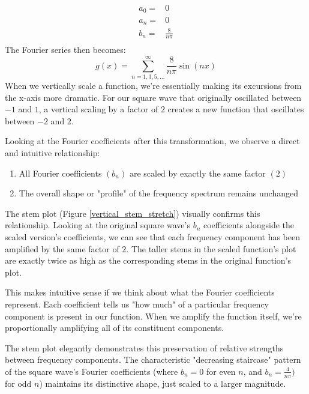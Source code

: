 \documentclass{article}
\begin{document}
    \begin{eqnarray}
    a_0 =& 0\nonumber\\
    a_n =& 0\\
    b_n =& \frac{8}{n\pi}\nonumber\\
    \end{eqnarray}
The Fourier series then becomes:
    \begin{equation}
g(x) = \sum_{n=1,3,5,...}^{\infty} \frac{8}{n\pi} \sin\left(nx\right)
    \end{equation}
When we vertically scale a function, we're essentially making its excursions from the x-axis more dramatic. For our square wave that originally oscillated between $-1$ and $1$, a vertical scaling by a factor of $2$ creates a new function that oscillates between $-2$ and $2$.
\vspace{0.2in}

Looking at the Fourier coefficients after this transformation, we observe a direct and intuitive relationship:

\begin{enumerate}
\item All Fourier coefficients $(b_n)$ are scaled by exactly the same factor $(2)$
\item The overall shape or "profile" of the frequency spectrum remains unchanged\\
\end{enumerate}
The stem plot (Figure \ref{vertical_stem_stretch}) visually confirms this relationship. Looking at the original square wave's $b_n$ coefficients alongside the scaled version's coefficients, we can see that each frequency component has been amplified by the same factor of $2$. The taller stems in the scaled function's plot are exactly twice as high as the corresponding stems in the original function's plot.
\vspace{0.2in}

This makes intuitive sense if we think about what the Fourier coefficients represent. Each coefficient tells us "how much" of a particular frequency component is present in our function. When we amplify the function itself, we're proportionally amplifying all of its constituent components.
\vspace{0.2in}

The stem plot elegantly demonstrates this preservation of relative strengths between frequency components. The characteristic "decreasing staircase" pattern of the square wave's Fourier coefficients (where $b_n = 0$ for even $n$, and $b_n = \frac{4}{n\pi})$ for odd $n$) maintains its distinctive shape, just scaled to a larger magnitude.\\
\end{document}
